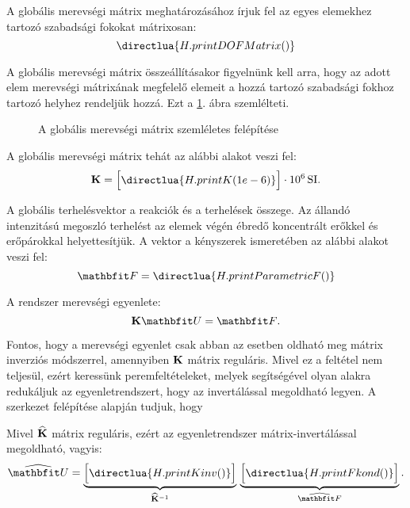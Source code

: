 A globális merevségi mátrix meghatározásához írjuk fel az egyes elemekhez
tartozó szabadsági fokokat mátrixosan:
\begin{equation}
  \directlua{H.printDOFMatrix()}
  \label{eq:DOF}
\end{equation}

A globális merevségi mátrix összeállításakor figyelnünk kell arra, hogy az adott
elem merevségi mátrixának megfelelő elemeit a hozzá tartozó szabadsági fokhoz
tartozó helyhez rendeljük hozzá. Ezt a \ref{fig:K}. ábra szemlélteti.
\begin{figure}[H]
  \centering
  
  \caption{A globális merevségi mátrix szemléletes felépítése}
  \label{fig:K}
\end{figure}

A globális merevségi mátrix tehát az alábbi alakot veszi fel:
\begin{equation}
  \siplaces{3}
  \rmat K = \begin{bmatrix}
    \directlua{H.printK(1e-6)}
  \end{bmatrix} \cdot 10^6 \, \mathrm{SI}
  \text.
  \label{eq:K}
\end{equation}

A globális terhelésvektor a reakciók és a terhelések összege. Az állandó
intenzitású megoszló terhelést az elemek végén ébredő koncentrált erőkkel
és erőpárokkal helyettesítjük. A vektor a kényszerek ismeretében az alábbi
alakot veszi fel:
\begin{equation}
  \def\arraystretch{1.2}
  \rvec{F} =
  \directlua{H.printParametricF()}
  \label{eq:F-param}
\end{equation}

A rendszer merevségi egyenlete:
\begin{equation}
  \rmat K \rvec U = \rvec F
  \text.
  \label{eq:KUF}
\end{equation}

Fontos, hogy a merevségi egyenlet csak abban az esetben oldható meg mátrix
inverziós módszerrel, amennyiben $\mathbf{K}$ mátrix reguláris. Mivel ez a
feltétel nem teljesül, ezért keressünk peremfeltételeket, melyek segítségével
olyan alakra redukáljuk az egyenletrendszert, hogy az invertálással megoldható
legyen. A szerkezet felépítése alapján tudjuk, hogy
%

%
Mivel $\widehat{\mathbf{K}}$ mátrix reguláris, ezért az egyenletrendszer
mátrix-invertálással megoldható, vagyis:
\begin{equation}
  \sifigures{3} \sisci{}
  \widehat{\rvec U} =
  \underbrace{\begin{bmatrix}
      \directlua{H.printKinv()}
    \end{bmatrix}}_{\widehat{\rmat K}^{-1}}
  \siplaces{2} \sifix{}
  \underbrace{\begin{bmatrix}
      \directlua{H.printFkond()}
    \end{bmatrix}}_{\widehat{\rvec F}}
  .
  \label{eq:inverted}
\end{equation}

